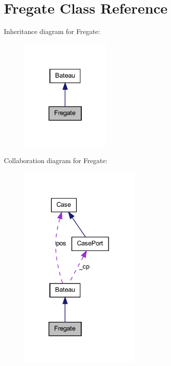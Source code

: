 \hypertarget{class_fregate}{
\section{Fregate Class Reference}
\label{class_fregate}
}


Inheritance diagram for Fregate:
\nopagebreak
\begin{figure}[H]
\begin{center}
\leavevmode
\includegraphics[width=130pt]{class_fregate__inherit__graph}
\end{center}
\end{figure}


Collaboration diagram for Fregate:
\nopagebreak
\begin{figure}[H]
\begin{center}
\leavevmode
\includegraphics[width=172pt]{class_fregate__coll__graph}
\end{center}
\end{figure}

